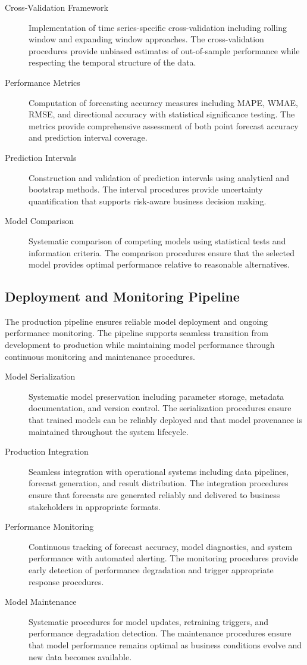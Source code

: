 		\begin{description}
			\item[Cross-Validation Framework] Implementation of time series-specific cross-validation including rolling window and expanding window approaches. The cross-validation procedures provide unbiased estimates of out-of-sample performance while respecting the temporal structure of the data.
			\item[Performance Metrics] Computation of forecasting accuracy measures including MAPE, WMAE, RMSE, and directional accuracy with statistical significance testing. The metrics provide comprehensive assessment of both point forecast accuracy and prediction interval coverage.
			\item[Prediction Intervals] Construction and validation of prediction intervals using analytical and bootstrap methods. The interval procedures provide uncertainty quantification that supports risk-aware business decision making.
			\item[Model Comparison] Systematic comparison of competing models using statistical tests and information criteria. The comparison procedures ensure that the selected model provides optimal performance relative to reasonable alternatives.
		\end{description}
		
		\subsection{Deployment and Monitoring Pipeline}
		
		The production pipeline ensures reliable model deployment and ongoing performance monitoring. The pipeline supports seamless transition from development to production while maintaining model performance through continuous monitoring and maintenance procedures.
		
		\begin{description}
			\item[Model Serialization] Systematic model preservation including parameter storage, metadata documentation, and version control. The serialization procedures ensure that trained models can be reliably deployed and that model provenance is maintained throughout the system lifecycle.
			\item[Production Integration] Seamless integration with operational systems including data pipelines, forecast generation, and result distribution. The integration procedures ensure that forecasts are generated reliably and delivered to business stakeholders in appropriate formats.
			\item[Performance Monitoring] Continuous tracking of forecast accuracy, model diagnostics, and system performance with automated alerting. The monitoring procedures provide early detection of performance degradation and trigger appropriate response procedures.
			\item[Model Maintenance] Systematic procedures for model updates, retraining triggers, and performance degradation detection. The maintenance procedures ensure that model performance remains optimal as business conditions evolve and new data becomes available.
		\end{description}
		
